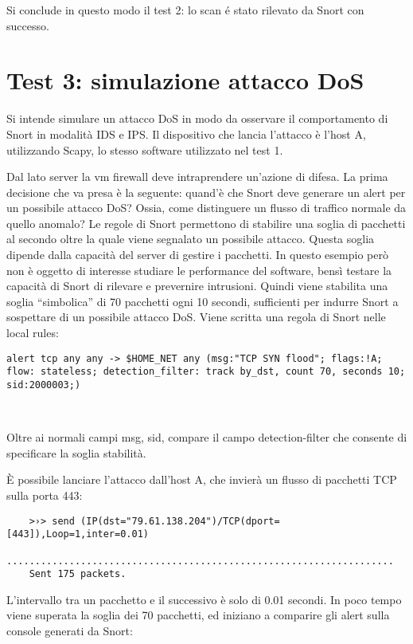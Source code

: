 Si conclude in questo modo il test 2: lo scan é stato rilevato da Snort con successo.

\section{Test 3: simulazione attacco DoS}

Si intende simulare un attacco DoS in modo da osservare il comportamento di Snort in modalità IDS e IPS. Il dispositivo che lancia l'attacco è l'host A, utilizzando Scapy, lo stesso software utilizzato nel test 1.

Dal lato server la vm firewall deve intraprendere un'azione di difesa. La prima decisione che va presa è la seguente: quand'è che Snort deve generare un alert per un possibile attacco DoS? Ossia, come distinguere un flusso di traffico normale da quello anomalo? Le regole di Snort permettono di stabilire una soglia di pacchetti al secondo oltre la quale viene segnalato un possibile attacco. Questa soglia dipende dalla capacità del server di gestire i pacchetti. In questo esempio però non è oggetto di interesse studiare le performance del software, bensì testare la capacità di Snort di rilevare e prevernire intrusioni. Quindi viene stabilita una soglia ``simbolica'' di 70 pacchetti ogni 10 secondi, sufficienti per indurre Snort a sospettare di un possibile attacco DoS. Viene scritta una regola di Snort nelle local rules:

\begin{verbatim}
alert tcp any any -> $HOME_NET any (msg:"TCP SYN flood"; flags:!A; 
flow: stateless; detection_filter: track by_dst, count 70, seconds 10;
sid:2000003;)
\end{verbatim}
~\cite{cyvatar}

Oltre ai normali campi msg, sid, compare il campo detection-filter che consente di specificare la soglia stabilità.

È possibile lanciare l'attacco dall'host A, che invierà un flusso di pacchetti TCP sulla porta 443:

\begin{verbatim}
    >›> send (IP(dst="79.61.138.204")/TCP(dport=[443]),Loop=1,inter=0.01)
    ....................................................................
    Sent 175 packets.
\end{verbatim}

L'intervallo tra un pacchetto e il successivo è solo di 0.01 secondi. In poco tempo viene superata la soglia dei 70 pacchetti, ed iniziano a comparire gli alert sulla console generati da Snort:

